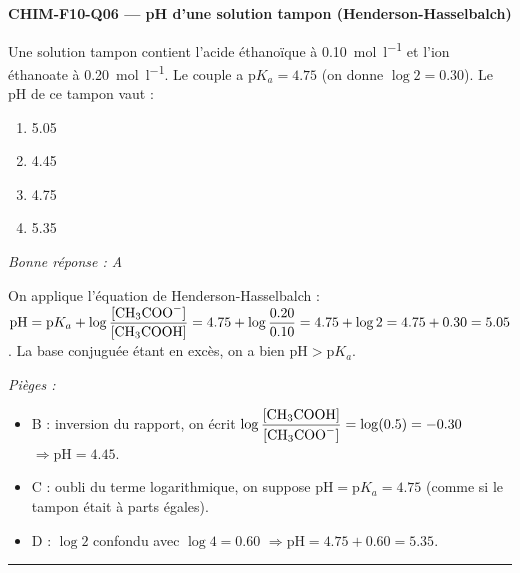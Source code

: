 \documentclass[11pt,a4paper]{article}
\begin{document}
\noindent\textbf{CHIM-F10-Q06 --- pH d'une solution tampon (Henderson-Hasselbalch)}\par
Une solution tampon contient l'acide éthanoïque  à \qty{0.10}{\mol\per\litre} et l'ion éthanoate  à \qty{0.20}{\mol\per\litre}. Le couple a $\mathrm{p}K_a = \num{4.75}$ (on donne $\log 2 = \num{0.30}$). Le pH de ce tampon vaut :
\begin{enumerate}[label=\Alph*)]
\item \num{5.05}
\item \num{4.45}
\item \num{4.75}
\item \num{5.35}
\end{enumerate}
\textit{Bonne réponse : A}\par
On applique l'équation de Henderson-Hasselbalch : $\mathrm{pH} = \mathrm{p}K_a + \log\dfrac{[\ce{CH3COO-}]}{[\ce{CH3COOH}]} = \num{4.75} + \log\dfrac{\num{0.20}}{\num{0.10}} = \num{4.75} + \log 2 = \num{4.75} + \num{0.30} = \num{5.05}$. La base conjuguée étant en excès, on a bien $\mathrm{pH} > \mathrm{p}K_a$.\par
\textit{Pièges :}
\begin{itemize}
\item B : inversion du rapport, on écrit $\log\dfrac{[\ce{CH3COOH}]}{[\ce{CH3COO-}]} = \log(\num{0.5}) = \num{-0.30}$ $\Rightarrow \mathrm{pH} = \num{4.45}$.
\item C : oubli du terme logarithmique, on suppose $\mathrm{pH} = \mathrm{p}K_a = \num{4.75}$ (comme si le tampon était à parts égales).
\item D : $\log 2$ confondu avec $\log 4 = \num{0.60}$ $\Rightarrow \mathrm{pH} = \num{4.75}+\num{0.60} = \num{5.35}$.
\end{itemize}
\vspace{6pt}\hrule\vspace{8pt}
\end{document}
